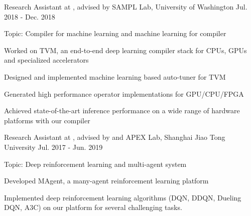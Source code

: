 

\begin{cventries}

\cventry
	{Research Assistant at , advised by } %
	{SAMPL Lab, University of Washington} %
	{Jul. 2018 - Dec. 2018} %
	{} %
	{
		\begin{cvitems} %
			\item{Topic: Compiler for machine learning and machine learning for compiler}
			\item {Worked on TVM, an end-to-end deep learning compiler stack for CPUs, GPUs and specialized accelerators
			}
			\item {Designed and implemented machine learning based auto-tuner for TVM}
			\item {Generated high performance operator implementations for GPU/CPU/FPGA}
			\item {Achieved state-of-the-art inference performance on a wide range of hardware platforms with our compiler}
		\end{cvitems}
}

\cventry
    {Research Assistant at , advised by  and } %
    {APEX Lab, Shanghai Jiao Tong University} %
    {Jul. 2017 - Jun. 2019} %
    {} %
    {
      \begin{cvitems} %
      \item{Topic: Deep reinforcement learning and multi-agent system}
      \item {Developed MAgent, a many-agent reinforcement learning platform}
      \item {Implemented deep reinforcement learning algorithms (DQN, DDQN, Dueling DQN, A3C) on our platform for several challenging tasks.}
      \end{cvitems}
    }
\end{cventries}
